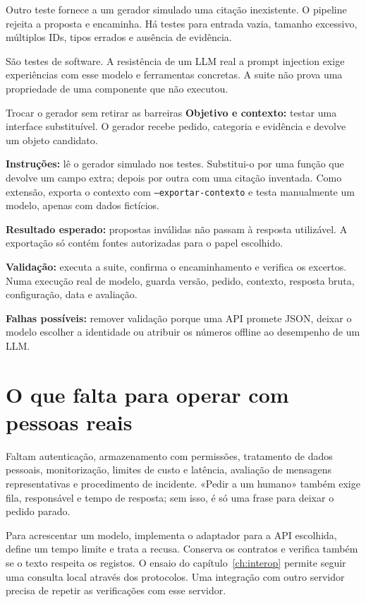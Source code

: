 Outro teste fornece a um gerador simulado uma citação inexistente. O pipeline rejeita a proposta e encaminha. Há testes para entrada vazia, tamanho excessivo, múltiplos IDs, tipos errados e ausência de evidência.

São testes de software. A resistência de um LLM real a prompt injection exige experiências com esse modelo e ferramentas concretas. A suite não prova uma propriedade de uma componente que não executou.

\begin{promptlabbox}{Trocar o gerador sem retirar as barreiras}
\textbf{Objetivo e contexto:} testar uma interface substituível. O gerador recebe pedido, categoria e evidência e devolve um objeto candidato.

\textbf{Instruções:} lê o gerador simulado nos testes. Substitui-o por uma função que devolve um campo extra; depois por outra com uma citação inventada. Como extensão, exporta o contexto com \texttt{--exportar-contexto} e testa manualmente um modelo, apenas com dados fictícios.

\textbf{Resultado esperado:} propostas inválidas não passam à resposta utilizável. A exportação só contém fontes autorizadas para o papel escolhido.

\textbf{Validação:} executa a suite, confirma o encaminhamento e verifica os excertos. Numa execução real de modelo, guarda versão, pedido, contexto, resposta bruta, configuração, data e avaliação.

\textbf{Falhas possíveis:} remover validação porque uma API promete JSON, deixar o modelo escolher a identidade ou atribuir os números offline ao desempenho de um LLM.
\end{promptlabbox}

\section{O que falta para operar com pessoas reais}
Faltam autenticação, armazenamento com permissões, tratamento de dados pessoais, monitorização, limites de custo e latência, avaliação de mensagens representativas e procedimento de incidente. «Pedir a um humano» também exige fila, responsável e tempo de resposta; sem isso, é só uma frase para deixar o pedido parado.

Para acrescentar um modelo, implementa o adaptador para a API escolhida, define um tempo limite e trata a recusa. Conserva os contratos e verifica também se o texto respeita os registos. O ensaio do capítulo~\ref{ch:interop} permite seguir uma consulta local através dos protocolos. Uma integração com outro servidor precisa de repetir as verificações com esse servidor.
